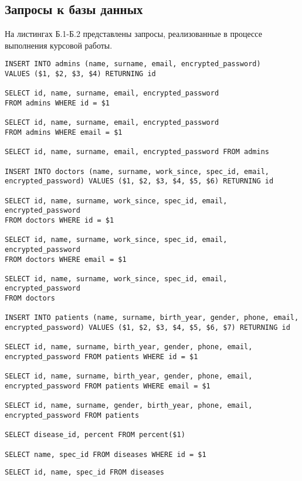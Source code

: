 \begin{appendices}
\chapter{Запросы к базы данных}

На листингах Б.1-Б.2 представлены запросы, реализованные в процессе выполнения курсовой работы. 

\begin{lstlisting}[caption={Запросы к базе данных}]
INSERT INTO admins (name, surname, email, encrypted_password) 
VALUES ($1, $2, $3, $4) RETURNING id

SELECT id, name, surname, email, encrypted_password 
FROM admins WHERE id = $1

SELECT id, name, surname, email, encrypted_password 
FROM admins WHERE email = $1

SELECT id, name, surname, email, encrypted_password FROM admins

INSERT INTO doctors (name, surname, work_since, spec_id, email, 
encrypted_password) VALUES ($1, $2, $3, $4, $5, $6) RETURNING id

SELECT id, name, surname, work_since, spec_id, email, encrypted_password 
FROM doctors WHERE id = $1

SELECT id, name, surname, work_since, spec_id, email, encrypted_password 
FROM doctors WHERE email = $1

SELECT id, name, surname, work_since, spec_id, email, encrypted_password 
FROM doctors

INSERT INTO patients (name, surname, birth_year, gender, phone, email, 
encrypted_password) VALUES ($1, $2, $3, $4, $5, $6, $7) RETURNING id

SELECT id, name, surname, birth_year, gender, phone, email, 
encrypted_password FROM patients WHERE id = $1

SELECT id, name, surname, birth_year, gender, phone, email, 
encrypted_password FROM patients WHERE email = $1

SELECT id, name, surname, gender, birth_year, phone, email, 
encrypted_password FROM patients

SELECT disease_id, percent FROM percent($1)

SELECT name, spec_id FROM diseases WHERE id = $1
\end{lstlisting}
\clearpage
\begin{lstlisting}[caption={Запросы к базе данных(продолжение)}]
SELECT id, name, spec_id FROM diseases


\end{lstlisting}
\end{appendices}
